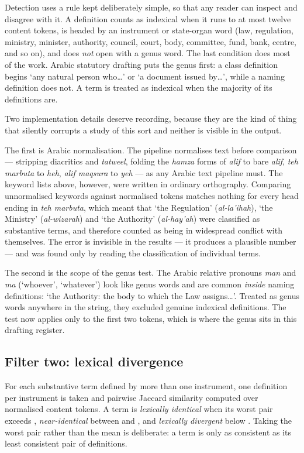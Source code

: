 \documentclass[11pt]{article}
\begin{document}
Detection uses a rule kept deliberately simple, so that any reader can
inspect and disagree with it. A definition counts as indexical when it runs
to at most twelve content tokens, is headed by an instrument or state-organ
word (law, regulation, ministry, minister, authority, council, court, body,
committee, fund, bank, centre, and so on), and does \emph{not} open with a
genus word. The last condition does most of the work. Arabic statutory
drafting puts the genus first: a class definition begins `any natural person
who\ldots' or `a document issued by\ldots', while a naming definition does
not. A term is treated as indexical when the majority of its definitions are.

Two implementation details deserve recording, because they are the kind of
thing that silently corrupts a study of this sort and neither is visible in
the output.

The first is Arabic normalisation. The pipeline normalises text before
comparison --- stripping diacritics and \emph{tatweel}, folding the
\emph{hamza} forms of \emph{alif} to bare \emph{alif}, \emph{teh marbuta} to
\emph{heh}, \emph{alif maqsura} to \emph{yeh} --- as any Arabic text pipeline
must. The keyword lists above, however, were written in ordinary orthography.
Comparing unnormalised keywords against normalised tokens matches nothing for
every head ending in \emph{teh marbuta}, which meant that `the Regulation'
(\emph{al-la'ihah}), `the Ministry' (\emph{al-wizarah}) and `the Authority'
(\emph{al-hay'ah}) were classified as substantive terms, and therefore
counted as being in widespread conflict with themselves. The error is
invisible in the results --- it produces a plausible number --- and was found
only by reading the classification of individual terms.

The second is the scope of the genus test. The Arabic relative pronouns
\emph{man} and \emph{ma} (`whoever', `whatever') look like genus words and
are common \emph{inside} naming definitions: `the Authority: the body to
which the Law assigns\ldots'. Treated as genus words anywhere in the string,
they excluded genuine indexical definitions. The test now applies only to the
first two tokens, which is where the genus sits in this drafting register.

\subsection{Filter two: lexical divergence}

For each substantive term defined by more than one instrument, one definition
per instrument is taken and pairwise Jaccard similarity computed over
normalised content tokens. A term is \emph{lexically identical} when its
worst pair exceeds \nThreshIdentical{}, \emph{near-identical} between
\nThreshNear{} and \nThreshIdentical{}, and
\emph{lexically divergent} below \nThreshNear{}. Taking the worst pair rather than the
mean is deliberate: a term is only as consistent as its least consistent
pair of definitions.
\end{document}
